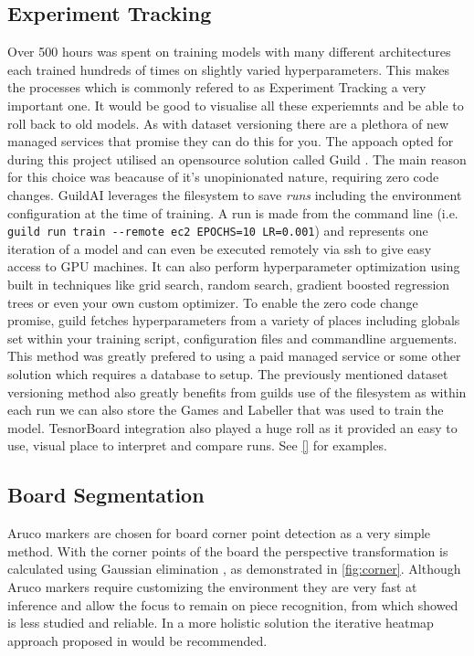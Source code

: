 \subsection{Experiment Tracking}
Over 500 hours was spent on training models with many different architectures each trained hundreds of times
on slightly varied hyperparameters.  This makes the processes which is commonly refered to as Experiment Tracking a very important one.
It would be good to visualise all these experiemnts and be able to roll back to old models.  As with dataset versioning there are a plethora of 
new managed services that promise they can do this for you.
The appoach opted for during this project utilised an opensource solution called Guild \cite{}.  The main reason for this choice was beacause of 
it's unopinionated nature, requiring zero code changes.  GuildAI leverages the filesystem to save \textit{runs} including the environment configuration
at the time of training.  A run is made from the command line (i.e. \verb|guild run train --remote ec2 EPOCHS=10 LR=0.001|) and
represents one iteration of a model and can even be executed remotely via ssh to give easy access to 
GPU machines.  It can also perform hyperparameter optimization using built in techniques like grid search, random search, gradient boosted regression trees 
or even your own custom optimizer.  To enable the zero code change promise, guild fetches hyperparameters from a variety of places including globals set within 
your training script, configuration files and commandline arguements.
This method was greatly prefered to using a paid managed service or some other solution which requires a database to setup.  
The previously mentioned dataset versioning method also greatly benefits from guilds use of the filesystem as within each run we can also store 
the Games and Labeller that was used to train the model. 
TesnorBoard integration also played a huge roll as it provided an easy to use, visual place to interpret and compare runs.  See \autoref{}
for examples.

\subsection{Board Segmentation}
Aruco markers are chosen for board corner point detection as a very simple method.
With the corner points of the board the perspective transformation is calculated using
Gaussian elimination \cite{gauss}, as demonstrated in \autoref{fig:corner}.
Although Aruco markers require customizing the environment they are very fast at 
inference and allow the focus to remain on piece recognition, from which
 showed is less studied and reliable.  In a more holistic solution the 
iterative heatmap approach proposed in \cite{heatmap} would be recommended.

